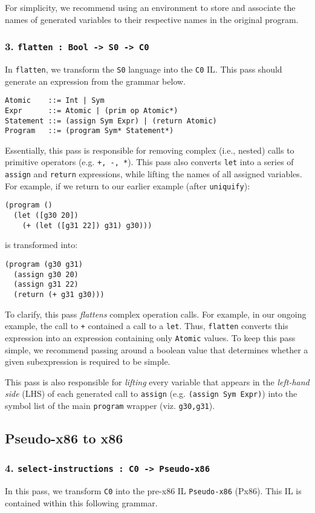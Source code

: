 \documentclass[12pt]{article}
\begin{document}
For simplicity, we recommend using an environment to store and associate the
names of generated variables to their respective names in the original program.

\subsubsection*{3. {\tt flatten : Bool -> S0 -> C0}}
In {\tt flatten}, we transform the {\tt S0} language into the {\tt C0} IL.
This pass should generate an expression from the grammar below.
\begin{verbatim}
Atomic    ::= Int | Sym
Expr      ::= Atomic | (prim op Atomic*)
Statement ::= (assign Sym Expr) | (return Atomic)
Program   ::= (program Sym* Statement*)
\end{verbatim}

Essentially, this pass is responsible for removing complex (i.e., nested) calls
to primitive operators (e.g. {\tt +, -, *}). This pass also converts {\tt let}
into a series of {\tt assign} and {\tt return} expressions, while lifting the
names of all assigned variables. For example, if we return to our earlier
example (after {\tt uniquify}):
\begin{verbatim}
(program ()
  (let ([g30 20])
    (+ (let ([g31 22]) g31) g30)))
\end{verbatim}
is transformed into:
\begin{verbatim}
(program (g30 g31) 
  (assign g30 20)
  (assign g31 22)
  (return (+ g31 g30)))
\end{verbatim}

To clarify, this pass \textit{flattens} complex operation calls. For example,
in our ongoing example, the call to {\tt +} contained a call to a {\tt let}.
Thus, {\tt flatten} converts this expression into an expression containing only
{\tt Atomic} values. To keep this pass simple, we recommend passing around a
boolean value that determines whether a given subexpression is required to be
simple.

This pass is also responsible for \textit{lifting} every variable that appears
in the \textit{left-hand side} (LHS) of each generated call to {\tt assign}
(e.g. {\tt (assign Sym Expr)}) into the symbol list of the main {\tt program}
wrapper (viz. {\tt g30,g31}).

\subsection*{Pseudo-x86 to x86}
\subsubsection*{4. {\tt select-instructions : C0 -> Pseudo-x86}}
In this pass, we transform {\tt C0} into the pre-x86 IL {\tt Pseudo-x86} (Px86).
This IL is contained within this following grammar.
\end{document}
